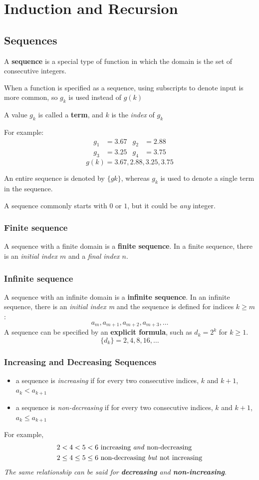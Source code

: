 \section{Induction and Recursion}
\subsection{Sequences}
A \textbf{sequence} is a special type of function in which the domain
is the set of consecutive integers.

When a function is specified as a sequence, using subscripts to denote input
is more common, so $g_k$ is used instead of $g(k)$

A value $g_k$ is called a \textbf{term}, and $k$ is the \textit{index} of $g_k$

For example:
\begin{align*}
  g_1 & = 3.67 & g_2 & = 2.88 \\
  g_3 & = 3.25 & g_4 & = 3.75
\end{align*}
\[
  g(k) = 3.67, 2.88, 3.25, 3.75
\]

An entire sequence is denoted by $\{gk\}$, whereas $g_k$ is used to denote a
single term in the sequence.

A sequence commonly starts with $0$ or $1$, but it could be \textit{any} integer.
\subsubsection*{Finite sequence}
A sequence with a finite domain is a \textbf{finite sequence}.
In a finite sequence, there is an \textit{initial index $m$} and a \textit{final index $n$}.
\subsubsection*{Infinite sequence}
A sequence with an infinite domain is a \textbf{infinite sequence}.
In an infinite sequence, there is an \textit{initial index m} and the sequence
is defined for indices $k \geq m$:
\[
  a_m, a_{m+1}, a_{m+2}, a_{m+3}, \ldots
\]
A sequence can be specified by an \textbf{explicit formula}, such as $d_k = 2^k$
for $k \geq 1$.
\[
  \{d_k\} = 2,4,8,16, \ldots
\]
\subsubsection*{Increasing and Decreasing Sequences}
\begin{itemize}
  \item a sequence is \textit{increasing} if for every two consecutive indices, $k$
        and $k+1$, $a_k < a_{k+1}$
  \item a sequence is \textit{non-decreasing} if for every two consecutive indices, $k$
        and $k+1$, $a_k \leq a_{k+1}$
\end{itemize}
For example,
\begin{align*}
  2 < 4 < 5 < 6          & ~\text{increasing \textit{and} non-decreasing}     \\
  2 \leq 4 \leq 5 \leq 6 & ~\text{non-decreasing \textit{but} not increasing}
\end{align*}
\textit{The same relationship can be said for \textbf{decreasing} and \textbf{non-increasing}}.
